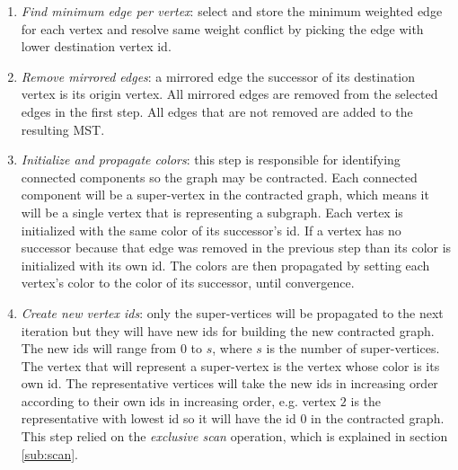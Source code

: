 \begin{enumerate}
	\item \emph{Find minimum edge per vertex}: select and store the minimum weighted edge for each vertex and resolve same weight conflict by picking the edge with lower destination vertex id.
	\item \emph{Remove mirrored edges}: a mirrored edge the successor of its destination vertex is its origin vertex.
	All mirrored edges are removed from the selected edges in the first step. All edges that are not removed are added to the resulting MST.

	\item \emph{Initialize and propagate colors}: this step is responsible for identifying connected components so the graph may be contracted.
	Each connected component will be a super-vertex in the contracted graph, which means it will be a single vertex that is representing a subgraph.
	Each vertex is initialized with the same color of its successor's id.
	If a vertex has no successor because that edge was removed in the previous step than its color is initialized with its own id.
	The colors are then propagated by setting each vertex's color to the color of its successor, until convergence.

	\item \emph{Create new vertex ids}: only the super-vertices will be propagated to the next iteration but they will have new ids for building the new contracted graph.
	The new ids will range from $0$ to $s$, where $s$ is the number of super-vertices.
	The vertex that will represent a super-vertex is the vertex whose color is its own id.
	The representative vertices will take the new ids in increasing order according to their own ids in increasing order, e.g. vertex $2$ is the representative with lowest id so it will have the id $0$ in the contracted graph.
	This step relied on the \emph{exclusive scan} operation, which is explained in section \ref{sub:scan}.


\end{enumerate}
